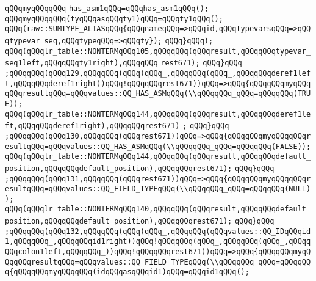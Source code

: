 \verb|qQQqmyqQQqqQQq|\newline
\verb|has_asm1qQQq=qQQqhas_asm1qQQq();|\newline
\verb|qQQqmyqQQqqQQq(tyqQQqasqQQqty1)qQQq=qQQqty1qQQq();|\newline
\verb|qQQq(raw::SUMTYPE_ALIASqQQq{qQQqnameqQQq=>qQQqid,qQQqtypevarsqQQq=>qQQqtypevar_seq,qQQqtypeqQQq=>qQQqty});|\newline
\verb|qQQq}qQQq);|\newline
\verb|qQQq(qQQqlr_table::NONTERMqQQq105,qQQqqQQq(qQQqresult,qQQqqQQqtypevar_seq1left,qQQqqQQqty1right),qQQqqQQq|\newline
\verb|rest671);|\newline
\verb|qQQq}qQQq|\newline
\verb|;qQQqqQQq(qQQq129,qQQqqQQq(qQQq(qQQq_,qQQqqQQq(qQQq_,qQQqqQQqderef1left,qQQqqQQqderef1right))qQQq!qQQqqQQqrest671))qQQq=>qQQq{qQQqqQQqmyqQQqqQQqresultqQQq=qQQqvalues::QQ_HAS_ASMqQQq(\\qQQqqQQq_qQQq=qQQqqQQq(TRUE));|\newline
\verb|qQQq(qQQqlr_table::NONTERMqQQq144,qQQqqQQq(qQQqresult,qQQqqQQqderef1left,qQQqqQQqderef1right),qQQqqQQqrest671)|\newline
\verb|;|\newline
\verb|qQQq}qQQq|\newline
\verb|;qQQqqQQq(qQQq130,qQQqqQQq(qQQqrest671))qQQq=>qQQq{qQQqqQQqmyqQQqqQQqresultqQQq=qQQqvalues::QQ_HAS_ASMqQQq(\\qQQqqQQq_qQQq=qQQqqQQq(FALSE));|\newline
\verb|qQQq(qQQqlr_table::NONTERMqQQq144,qQQqqQQq(qQQqresult,qQQqqQQqdefault_position,qQQqqQQqdefault_position),qQQqqQQqrest671);|\newline
\verb|qQQq}qQQq|\newline
\verb|;qQQqqQQq(qQQq131,qQQqqQQq(qQQqrest671))qQQq=>qQQq{qQQqqQQqmyqQQqqQQqresultqQQq=qQQqvalues::QQ_FIELD_TYPEqQQq(\\qQQqqQQq_qQQq=qQQqqQQq(NULL));|\newline
\verb|qQQq(qQQqlr_table::NONTERMqQQq140,qQQqqQQq(qQQqresult,qQQqqQQqdefault_position,qQQqqQQqdefault_position),qQQqqQQqrest671);|\newline
\verb|qQQq}qQQq|\newline
\verb|;qQQqqQQq(qQQq132,qQQqqQQq(qQQq(qQQq_,qQQqqQQq(qQQqvalues::QQ_IDqQQqid1,qQQqqQQq_,qQQqqQQqid1right))qQQq!qQQqqQQq(qQQq_,qQQqqQQq(qQQq_,qQQqqQQqcolon1left,qQQqqQQq_))qQQq!qQQqqQQqrest671))qQQq=>qQQq{qQQqqQQqmyqQQqqQQqresultqQQq=qQQqvalues::QQ_FIELD_TYPEqQQq(\\qQQqqQQq_qQQq=qQQqqQQq{qQQqqQQqmyqQQqqQQq(idqQQqasqQQqid1)qQQq=qQQqid1qQQq();|\newline
